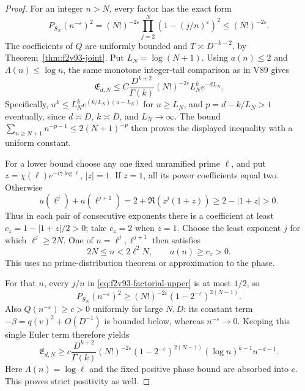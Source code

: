 \documentclass[11pt]{article}
\theoremstyle{definition}
\theoremstyle{remark}
\begin{document}
\begin{proof}
For an integer \(n>N\), every factor has the exact form
\begin{equation}
 P_{S_N}(n^{-\varepsilon})^2
 =(N!)^{-2\varepsilon}
       \prod_{j=2}^N(1-(j/n)^{\varepsilon})^2
 \le(N!)^{-2\varepsilon}.
 \label{eq:f2v93-factorial-upper}
\end{equation}
The coefficients of \(Q\) are uniformly bounded and
\(T\asymp D^{-k-2}\), by Theorem~\ref{thm:f2v93-joint}.
Put \(L_N=\log(N+1)\).  Using \(a(n)\le2\) and
\(\Lambda(n)\le\log n\), the same monotone integer-tail
comparison as in V89 gives
\begin{equation}
 \mathfrak E_{d,N}\le
 C\frac{D^{k+2}}{\Gamma(k)}(N!)^{-2\varepsilon}
                      L_N^k e^{-dL_N}.
 \label{eq:f2v93-Euler-upper}
\end{equation}
Specifically, \(u^k\le L_N^ke^{(k/L_N)(u-L_N)}\) for
\(u\ge L_N\), and \(p=d-k/L_N>1\) eventually, since
\(d\asymp D\), \(k\asymp D\), and \(L_N\to\infty\).
The bound \(\sum_{n\ge N+1}n^{-p-1}\le2(N+1)^{-p}\)
then proves the displayed inequality with a uniform constant.

For a lower bound choose any one fixed unramified prime \(\ell\),
and put \(z=\chi(\ell)e^{-i\gamma\log\ell}\), \(|z|=1\).
If \(z=1\), all its power coefficients equal two.  Otherwise
\[
 a(\ell^j)+a(\ell^{j+1})
 =2+\Re(z^j(1+z))\ge2-|1+z|>0.
\]
Thus in each pair of consecutive exponents there is a coefficient
at least \(c_z=1-|1+z|/2>0\); take \(c_z=2\) when \(z=1\).
Choose the least exponent \(j\) for which \(\ell^j\ge2N\).
One of \(n=\ell^j,\ell^{j+1}\) then satisfies
\begin{equation}
 2N\le n<2\ell^2N,\qquad a(n)\ge c_z>0.
 \label{eq:f2v93-survivor}
\end{equation}
This uses no prime-distribution theorem or approximation to the phase.

For that \(n\), every \(j/n\) in
\eqref{eq:f2v93-factorial-upper} is at most \(1/2\), so
\[
 P_{S_N}(n^{-\varepsilon})^2
 \ge(N!)^{-2\varepsilon}(1-2^{-\varepsilon})^{2(N-1)}.
\]
Also \(Q(n^{-\varepsilon})\ge c>0\) uniformly for large \(N,D\):
its constant term \(-\beta=q(v)^2+O(D^{-1})\) is bounded below,
whereas \(n^{-\varepsilon}\to0\).  Keeping this single Euler term
therefore yields
\begin{equation}
 \mathfrak E_{d,N}\ge
 c\frac{D^{k+2}}{\Gamma(k)}(N!)^{-2\varepsilon}
 (1-2^{-\varepsilon})^{2(N-1)}
       (\log n)^{k-1}n^{-d-1}.
 \label{eq:f2v93-Euler-lower}
\end{equation}
Here \(\Lambda(n)=\log\ell\) and the fixed positive phase bound
are absorbed into \(c\).  This proves strict positivity as well.


\end{proof}
\end{document}
